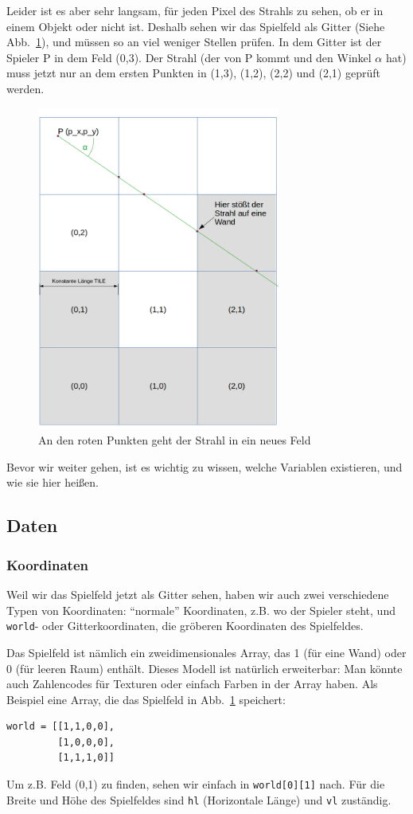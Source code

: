 \documentclass[a4paper,12pt]{report}
\begin{document}
Leider ist es aber sehr langsam, für jeden Pixel des Strahls zu sehen, ob er in einem Objekt oder nicht ist. Deshalb sehen wir das Spielfeld als Gitter (Siehe Abb.~\ref{fig:grid}), und müssen so an viel weniger Stellen prüfen. In dem Gitter ist der Spieler P in dem Feld (0,3). Der Strahl (der von P kommt und den Winkel $\alpha$ hat) muss jetzt nur an dem ersten Punkten in (1,3), (1,2), (2,2) und (2,1) geprüft werden.
\begin{figure}[htbp]
        \centering
        \includegraphics[width=8cm]{grid.png} 
        \caption{An den roten Punkten geht der Strahl in ein neues Feld}
        \label{fig:grid}
\end{figure}

Bevor wir weiter gehen, ist es wichtig zu wissen, welche Variablen existieren, und wie sie hier heißen.

\subsection{Daten}
\subsubsection{Koordinaten}
Weil wir das Spielfeld jetzt als Gitter sehen, haben wir auch zwei verschiedene Typen von Koordinaten: ``normale'' Koordinaten, z.B. wo der Spieler steht, und \texttt{world}- oder Gitterkoordinaten, die gröberen Koordinaten des Spielfeldes.

Das Spielfeld ist nämlich ein zweidimensionales Array, das 1 (für eine Wand) oder 0 (für leeren Raum) enthält. Dieses Modell ist natürlich erweiterbar: Man könnte auch Zahlencodes für Texturen oder einfach Farben in der Array haben. Als Beispiel eine Array, die das Spielfeld in Abb.~\ref{fig:grid} speichert:
\begin{Verbatim}[baselinestretch=1.0, xleftmargin=1cm]
world = [[1,1,0,0],
         [1,0,0,0],
         [1,1,1,0]]
\end{Verbatim}
Um z.B. Feld (0,1) zu finden, sehen wir einfach in \texttt{world[0][1]} nach. Für die Breite und Höhe des Spielfeldes sind \texttt{hl} (Horizontale Länge) und \texttt{vl} zuständig. 
\end{document}
